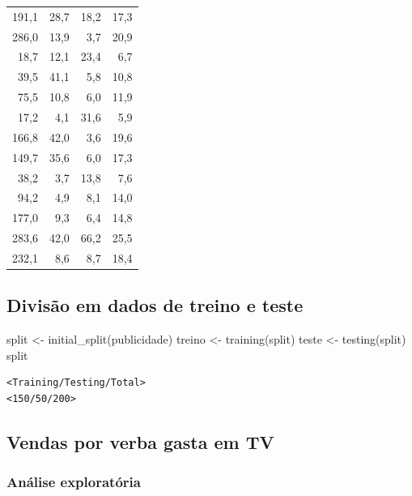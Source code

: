 \documentclass[
  letterpaper,
  DIV=11,
  numbers=noendperiod]{scrreprt}
\newenvironment{Shaded}{\begin{snugshade}}{\end{snugshade}}
\newcommand{\FunctionTok}[1]{\textcolor[rgb]{0.28,0.35,0.67}{#1}}
\newcommand{\NormalTok}[1]{\textcolor[rgb]{0.00,0.23,0.31}{#1}}
\newcommand{\OtherTok}[1]{\textcolor[rgb]{0.00,0.23,0.31}{#1}}
\begin{document}
\begin{longtable*}{rrrr}
191,1 & 28,7 & 18,2 & 17,3 \\ 
286,0 & 13,9 & 3,7 & 20,9 \\ 
18,7 & 12,1 & 23,4 & 6,7 \\ 
39,5 & 41,1 & 5,8 & 10,8 \\ 
75,5 & 10,8 & 6,0 & 11,9 \\ 
17,2 & 4,1 & 31,6 & 5,9 \\ 
166,8 & 42,0 & 3,6 & 19,6 \\ 
149,7 & 35,6 & 6,0 & 17,3 \\ 
38,2 & 3,7 & 13,8 & 7,6 \\ 
94,2 & 4,9 & 8,1 & 14,0 \\ 
177,0 & 9,3 & 6,4 & 14,8 \\ 
283,6 & 42,0 & 66,2 & 25,5 \\ 
232,1 & 8,6 & 8,7 & 18,4 \\ 
\bottomrule
\end{longtable*}

\subsection{Divisão em dados de treino e
teste}\label{divisuxe3o-em-dados-de-treino-e-teste}

\begin{Shaded}
\begin{Highlighting}[]
\NormalTok{split }\OtherTok{\textless{}{-}} \FunctionTok{initial\_split}\NormalTok{(publicidade)}
\NormalTok{treino }\OtherTok{\textless{}{-}} \FunctionTok{training}\NormalTok{(split)}
\NormalTok{teste }\OtherTok{\textless{}{-}} \FunctionTok{testing}\NormalTok{(split)}
\NormalTok{split}
\end{Highlighting}
\end{Shaded}

\begin{verbatim}
<Training/Testing/Total>
<150/50/200>
\end{verbatim}

\subsection{Vendas por verba gasta em
TV}\label{vendas-por-verba-gasta-em-tv}

\subsubsection{Análise exploratória}\label{anuxe1lise-exploratuxf3ria}
\end{document}
